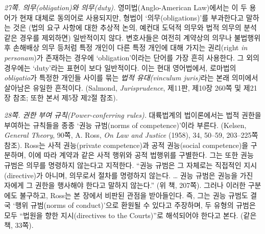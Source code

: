 \documentclass[12pt, oneside]{book}  %
\begin{document}
\emph{27쪽. 의무(obligation)와 의무(duty).} 영미법(Anglo-American
Law)에서는 이 두 용어가 현재 대체로 동의어로 사용되지만, 형법이
`의무(obligations)'를 부과한다고 말하는 것은 (법의 요구 사항에 대한
추상적 논의, 예컨대 도덕적 의무와 법적 의무의 분석 같은 경우를 제외하면)
일반적이지 않다. 변호사들은 여전히 계약상의 의무나 불법행위 후 손해배상
의무 등처럼 특정 개인이 다른 특정 개인에 대해 가지는 권리(right \emph{in
personam})가 존재하는 경우에 `obligation'이라는 단어를 가장 흔히
사용한다. 그 외의 경우에는 `duty'라는 표현이 보다 일반적이다. 이는 현대
영어법에서, 로마법의 \emph{obligatio}가 특정한 개인들 사이를 묶는
\emph{법적 유대(vinculum juris)}라는 본래 의미에서 살아남은 유일한
흔적이다. (Salmond, \emph{Jurisprudence}, 제11판, 제10장 260쪽 및 제21장
참조; 또한 본서 제5장 제2절 참조).

\emph{28쪽. 권한 부여 규칙(Power-conferring rules).} 대륙법계의
법이론에서는 법적 권한을 부여하는 규칙들을 종종 `권능 규범(norms of
competence)'이라 부른다. (Kelsen, \emph{General Theory}, 90쪽, A. Ross,
\emph{On Law and Justice} (1958), 34, 50--59, 203--225쪽 참조). Ross는
사적 권능(private competence)과 공적 권능(social competence)을 구분하며,
이에 따라 계약과 같은 사적 행위와 공적 법행위를 구별한다. 그는 또한 권능
규범은 의무를 명령하지 않는다고 지적한다. ``권능 규범은 그 자체로는
직접적인 지시(directive)가 아니며, 의무로서 절차를 명령하지 않는다.
\ldots{} 권능 규범은 권능을 가진 자에게 그 권한을 행사해야 한다고 말하지
않는다.'' (위 책, 207쪽). 그러나 이러한 구분에도 불구하고, Ross는 본
장에서 비판된 관점을 받아들인다. 즉, 그는 권능 규범도 결국 `행위
규범(norms of conduct)'으로 환원될 수 있다고 주장하며, 두 유형의 규범은
모두 ``법원을 향한 지시(directives to the Courts)''로 해석되어야 한다고
본다. (같은 책, 33쪽).
\end{document}
